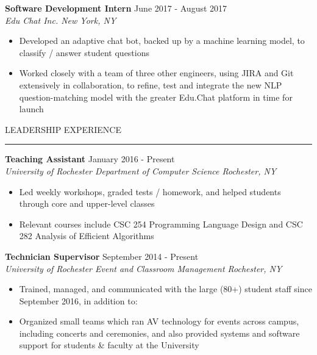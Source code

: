 \documentclass{report}
\begin{document}
\vspace{8pt} \textbf{Software Development Intern} \hfill June 2017 - August 2017 \\
\textit{Edu Chat Inc. \hfill New York, NY}
\begin{itemize} [noitemsep,topsep=4pt] %
	\item Developed an adaptive chat bot, backed up by a machine learning model, to classify / answer student questions
	\item Worked closely with a team of three other engineers, using JIRA and Git extensively in collaboration, to refine, test and integrate the new NLP question-matching model with the greater Edu.Chat platform in time for launch
\end{itemize}

\vspace{8pt} LEADERSHIP EXPERIENCE
\vspace{4pt} \textcolor{gray}{\hrule}

\vspace{14pt} \textbf{Teaching Assistant} \hfill January 2016 - Present \\
\textit{University of Rochester Department of Computer Science \hfill Rochester, NY}
\begin{itemize} [noitemsep,topsep=4pt]
	\item Led weekly workshops, graded tests / homework, and helped students through core and upper-level classes
	\item Relevant courses include CSC 254 Programming Language Design and CSC 282 Analysis of Efficient Algorithms 
\end{itemize}

\vspace{8pt} \textbf{Technician Supervisor} \hfill September 2014 - Present \\
\textit{University of Rochester Event and Classroom Management \hfill Rochester, NY}
\begin{itemize} [noitemsep,topsep=4pt]
	\item Trained, managed, and communicated with the large (80+) student staff since September 2016, in addition to:
	\item Organized small teams which ran AV technology for events across campus, including concerts and ceremonies, and also provided systems and software support for students \& faculty at the University 
\end{itemize}

\end{document}
